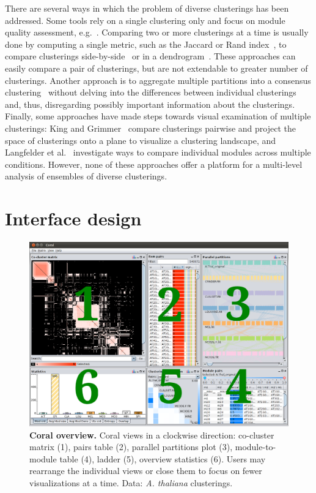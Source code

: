 \documentclass[12pt]{cmuthesis}
\makeatletter
\newcommand{\Athal}{\textit{A. thaliana}\xspace}
\newcommand{\eg}{e.g.\@}
\makeatother
\begin{document}
  There are several ways in which the problem of diverse clusterings has been addressed. Some tools rely on a single clustering only and focus on module quality assessment, \eg~\cite{Yu2007a, Hibbs2005}. Comparing two or more clusterings at a time is usually done by computing a single metric, such as the Jaccard or Rand index~\cite{Thalamuthu2006}, to compare clusterings side-by-side~\cite{Seo2007a} or in a dendrogram~\cite{Laderas2007}. These approaches can easily compare a pair of clusterings, but are not extendable to greater number of clusterings. Another approach is to aggregate multiple partitions into a consensus clustering~\cite{strehl02, Monti2003a} without delving into the differences between individual clusterings and, thus, disregarding possibly important information about the clusterings. Finally, some approaches have made steps towards visual examination of multiple clusterings: King and Grimmer~\cite{Grimmer2011} compare clusterings pairwise and project the space of clusterings onto a plane to visualize a clustering landscape, and Langfelder et al.~\cite{Langfelder2011} investigate ways to compare individual modules across multiple conditions. However, none of these approaches offer a platform for a multi-level analysis of ensembles of diverse clusterings.


\section{Interface design}

  \begin{figure}[htb!]
    \centering
    \includegraphics[width=\linewidth]{figures/coral_overview.png}
    \caption{\textbf{Coral overview.} Coral views in a clockwise direction: co-cluster matrix (1), pairs table (2), parallel partitions plot (3), module-to-module table (4), ladder (5), overview statistics (6). Users may rearrange the individual views or close them to focus on fewer visualizations at a time. Data: \Athal clusterings.}
    \label{fig:coral:overview}
  \end{figure}
\end{document}
